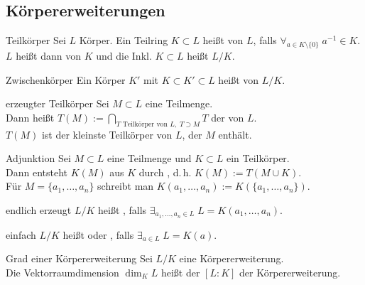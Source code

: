 \subsection{%
    Körpererweiterungen%
}

\begin{Def}{Teilkörper}
    Sei $L$ Körper.
    Ein Teilring $K \subset L$ heißt  von $L$,
    falls
    $\forall_{a \in K \setminus \{0\}}\; a^{-1} \in K$.\\
    $L$ heißt dann  von $K$
    und die Inkl. $K \subset L$ heißt  $L/K$.
\end{Def}

\begin{Def}{Zwischenkörper}
    Ein Körper $K'$ mit $K \subset K' \subset L$ heißt 
    von $L/K$.
\end{Def}

\begin{Def}{erzeugter Teilkörper}
    Sei $M \subset L$ eine Teilmenge.\\
    Dann heißt $T(M) := \bigcap_{T \text{ Teilkörper von } L,\; T \supset M} T$
    der  von $L$.\\
    $T(M)$ ist der kleinste Teilkörper von $L$, der $M$ enthält.
\end{Def}

\begin{Def}{Adjunktion}
    Sei $M \subset L$ eine Teilmenge und $K \subset L$ ein Teilkörper.\\
    Dann entsteht $K(M)$ aus $K$ durch , d.\,h.
    $K(M) := T(M \cup K)$.\\
    Für $M = \{a_1, \dotsc, a_n\}$ schreibt man
    $K(a_1, \dotsc, a_n) := K(\{a_1, \dotsc, a_n\})$.
\end{Def}

\begin{Def}{endlich erzeugt}
    $L/K$ heißt , falls
    $\exists_{a_1, \dotsc, a_n \in L}\; L = K(a_1, \dotsc, a_n)$.
\end{Def}

\begin{Def}{einfach}
    $L/K$ heißt  oder , falls
    $\exists_{a \in L}\; L = K(a)$.
\end{Def}

\linie

\begin{Def}{Grad einer Körpererweiterung}
    Sei $L/K$ eine Körpererweiterung.\\
    Die Vektorraumdimension $\dim_K L$ heißt der  $[L:K]$
    der Körpererweiterung.
\end{Def}

